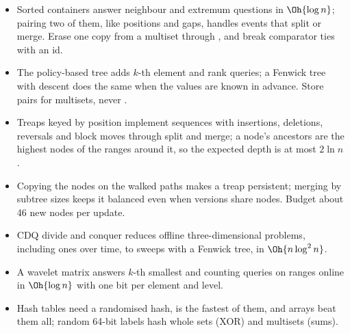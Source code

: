 \begin{summary}
\begin{itemize}
  \item Sorted containers answer neighbour and extremum questions in $\Oh{\log n}$; pairing two of them, like positions and gaps,
        handles events that split or merge. Erase one copy from a multiset through , and break comparator ties with an id.
  \item The policy-based tree adds $k$-th element and rank queries; a Fenwick tree with descent does the same when the values are
        known in advance. Store pairs for multisets, never .
  \item Treaps keyed by position implement sequences with insertions, deletions, reversals and block moves through split and merge;
        a node's ancestors are the highest nodes of the ranges around it, so the expected depth is at most $2 \ln n$.
  \item Copying the nodes on the walked paths makes a treap persistent; merging by subtree sizes keeps it balanced even when versions
        share nodes. Budget about 46 new nodes per update.
  \item CDQ divide and conquer reduces offline three-dimensional problems, including ones over time, to sweeps with a Fenwick tree,
        in $\Oh{n \log^2 n}$.
  \item A wavelet matrix answers $k$-th smallest and counting queries on ranges online in $\Oh{\log n}$ with one bit per element and
        level.
  \item Hash tables need a randomised hash,  is the fastest of them, and arrays beat them all; random 64-bit labels
        hash whole sets (XOR) and multisets (sums).
\end{itemize}
\end{summary}

